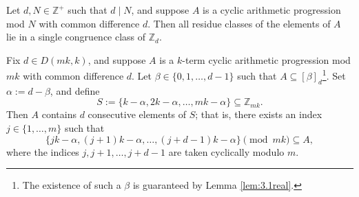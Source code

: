 \documentclass[10pt,a4paper]{amsart}
\begin{document}
\begin{lemma}
\label{lem:3.1real}
    Let $d,N \in \mathbb{Z}^+$ such that $d \mid N$, and suppose $A$ is a cyclic arithmetic progression mod $N$ with common difference $d$. Then all residue classes of the elements of $A$ lie in a single congruence class of $\mathbb{Z}_{d}$.
\end{lemma}

\begin{lemma}\label{lem:cons}
Fix $d \in D(mk,k)$, and suppose $A$ is a $k$-term cyclic arithmetic progression mod $mk$ with common difference $d$. Let $\beta \in \{0,1,\ldots,d-1\}$ such that $A \subseteq [\beta]_d$\footnote{The existence of such a $\beta$ is guaranteed by Lemma \ref{lem:3.1real}.}. Set $\alpha := d-\beta$, and define \[S := \{k-\alpha,2k-\alpha,\ldots,mk-\alpha\} \subseteq \mathbb{Z}_{mk}.\] Then $A$ contains $d$ consecutive elements of $S$; that is, there exists an index $j \in \{1,\ldots,m\}$ such that \[\{jk-\alpha,(j+1)k-\alpha,\ldots,(j+d-1)k-\alpha\} \pmod {mk} \subseteq A,\] where the indices $j,j+1,\ldots,j+d-1$ are taken cyclically modulo $m$.
\end{lemma}
\end{document}
